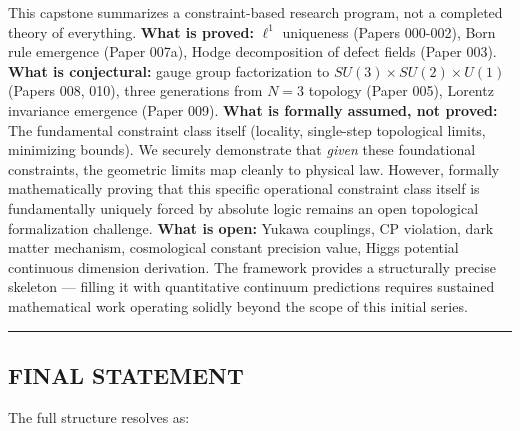 \documentclass[
]{article}
\begin{document}
This capstone summarizes a constraint-based research program, not a
completed theory of everything. \textbf{What is proved:} \(\ell^1\)
uniqueness (Papers 000-002), Born rule emergence (Paper 007a), Hodge
decomposition of defect fields (Paper 003). \textbf{What is
conjectural:} gauge group factorization to
\(SU(3)\times SU(2)\times U(1)\) (Papers 008, 010), three generations
from \(N=3\) topology (Paper 005), Lorentz invariance emergence (Paper
009). \textbf{What is formally assumed, not proved:} The fundamental
constraint class itself (locality, single-step topological limits,
minimizing bounds). We securely demonstrate that \emph{given} these
foundational constraints, the geometric limits map cleanly to physical
law. However, formally mathematically proving that this specific
operational constraint class itself is fundamentally uniquely forced by
absolute logic remains an open topological formalization challenge.
\textbf{What is open:} Yukawa couplings, CP violation, dark matter
mechanism, cosmological constant precision value, Higgs potential
continuous dimension derivation. The framework provides a structurally
precise skeleton --- filling it with quantitative continuum predictions
requires sustained mathematical work operating solidly beyond the scope
of this initial series.

\begin{center}\rule{0.5\linewidth}{0.5pt}\end{center}

\subsection{FINAL STATEMENT}\label{final-statement}

The full structure resolves as:
\end{document}
